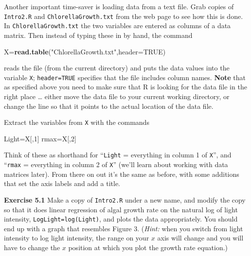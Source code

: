 \documentclass[11pt,]{article}
\newenvironment{Shaded}{\begin{snugshade}}{\end{snugshade}}
\newcommand{\KeywordTok}[1]{\textcolor[rgb]{0.13,0.29,0.53}{\textbf{#1}}}
\newcommand{\DataTypeTok}[1]{\textcolor[rgb]{0.13,0.29,0.53}{#1}}
\newcommand{\DecValTok}[1]{\textcolor[rgb]{0.00,0.00,0.81}{#1}}
\newcommand{\StringTok}[1]{\textcolor[rgb]{0.31,0.60,0.02}{#1}}
\newcommand{\OtherTok}[1]{\textcolor[rgb]{0.56,0.35,0.01}{#1}}
\newcommand{\NormalTok}[1]{#1}
\begin{document}
Another important time-saver is loading data from a text file. Grab
copies of \texttt{Intro2.R} and \texttt{ChlorellaGrowth.txt} from the
web page to see how this is done. In \texttt{ChlorellaGrowth.txt} the
two variables are entered as columns of a data matrix. Then instead of
typing these in by hand, the command

\begin{Shaded}
\begin{Highlighting}[]
\NormalTok{X=}\KeywordTok{read.table}\NormalTok{(}\StringTok{"ChlorellaGrowth.txt"}\NormalTok{,}\DataTypeTok{header=}\OtherTok{TRUE}\NormalTok{)}
\end{Highlighting}
\end{Shaded}

reads the file (from the current directory) and puts the data values
into the variable \texttt{X}; \texttt{header=TRUE} specifies that the
file includes column names. \textbf{Note} that as specified above you
need to make sure that R is looking for the data file in the right place
\ldots{} either move the data file to your current working directory, or
change the line so that it points to the actual location of the data
file.

Extract the variables from \texttt{X} with the commands

\begin{Shaded}
\begin{Highlighting}[]
\NormalTok{Light=X[,}\DecValTok{1}\NormalTok{]}
\NormalTok{rmax=X[,}\DecValTok{2}\NormalTok{]}
\end{Highlighting}
\end{Shaded}

Think of these as shorthand for ``\texttt{Light} = everything in column
1 of \texttt{X}'', and ``\texttt{rmax} = everything in column 2 of
\texttt{X}'' (we'll learn about working with data matrices later). From
there on out it's the same as before, with some additions that set the
axis labels and add a title.

\textbf{Exercise 5.1} Make a copy of \texttt{Intro2.R} under a new name,
and modify the copy so that it does linear regression of algal growth
rate on the natural log of light intensity,
\texttt{LogLight=log(Light)}, and plots the data appropriately. You
should end up with a graph that resembles Figure 3. (\emph{Hint:} when
you switch from light intensity to log light intensity, the range on
your \(x\) axis will change and you will have to change the \(x\)
position at which you plot the growth rate equation.)
\end{document}
